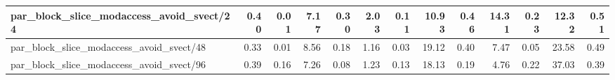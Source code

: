 \begin{table}[H]
\begin{tabular}{|lllllllllllll|}
		\multicolumn{1}{|l|}{par\_block\_slice\_modaccess\_avoid\_svect/24}  & \multicolumn{1}{r|}{0.40} & \multicolumn{1}{r|}{0.01} & \multicolumn{1}{r|}{7.17} & \multicolumn{1}{r|}{0.30}  & \multicolumn{1}{r|}{2.03} & \multicolumn{1}{r|}{0.11} & \multicolumn{1}{r|}{10.93} & \multicolumn{1}{r|}{0.46}  & \multicolumn{1}{r|}{14.31} & \multicolumn{1}{r|}{0.23} & \multicolumn{1}{r|}{12.32} & \multicolumn{1}{r|}{0.51}  \\ \hline
		\multicolumn{1}{|l|}{par\_block\_slice\_modaccess\_avoid\_svect/48}  & \multicolumn{1}{r|}{0.33} & \multicolumn{1}{r|}{0.01} & \multicolumn{1}{r|}{8.56} & \multicolumn{1}{r|}{0.18}  & \multicolumn{1}{r|}{1.16} & \multicolumn{1}{r|}{0.03} & \multicolumn{1}{r|}{19.12} & \multicolumn{1}{r|}{0.40}  & \multicolumn{1}{r|}{7.47} & \multicolumn{1}{r|}{0.05} & \multicolumn{1}{r|}{23.58} & \multicolumn{1}{r|}{0.49}  \\ \hline
		\multicolumn{1}{|l|}{par\_block\_slice\_modaccess\_avoid\_svect/96}  & \multicolumn{1}{r|}{0.39} & \multicolumn{1}{r|}{0.16} & \multicolumn{1}{r|}{7.26} & \multicolumn{1}{r|}{0.08}  & \multicolumn{1}{r|}{1.23} & \multicolumn{1}{r|}{0.13} & \multicolumn{1}{r|}{18.13} & \multicolumn{1}{r|}{0.19}  & \multicolumn{1}{r|}{4.76} & \multicolumn{1}{r|}{0.22} & \multicolumn{1}{r|}{37.03} & \multicolumn{1}{r|}{0.39}  \\ \hline
	\end{tabular}
\end{table}
